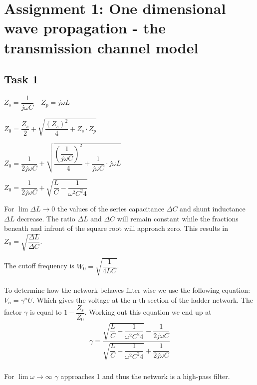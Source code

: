 \documentclass[final]{scrreprt} %
\begin{document}
\chapter{Assignment 1: One dimensional wave propagation - the transmission channel model}
\label{ch:sk5-ass1-task1}
\section*{Task 1}
\begin{center}
$Z_s = \dfrac{1}{j \omega C}$\,\,\,\, $Z_p = j \omega L$

$Z_0 = \dfrac{Z_s}{2} + \sqrt{\dfrac{(Z_s)^2}{4} + Z_s \cdot Z_p}$

$Z_0 = \dfrac{1}{2j \omega C} + \sqrt{\dfrac{(\dfrac{1}{j \omega C})^2}{4} + \dfrac{1}{j \omega C} \cdot j \omega L}$

$Z_0 = \dfrac{1}{2j \omega C} + \sqrt{\dfrac{L}{C} - \dfrac{1}{\omega^2 C^2 4}}$
\end{center}
For $\lim{\Delta  L\to 0}$ the values of the series capacitance $\Delta C$ and shunt inductance $\Delta L$ decrease. The ratio $\Delta L$ and $\Delta C$ will remain constant while the fractions beneath and infront of the square root will approach zero. This results in $Z_0 = \sqrt{\dfrac{\Delta L}{\Delta C}}$.

The cutoff frequency is $W_0 = \sqrt{\dfrac{1}{4LC}}$.\\
\\
To determine how the network behaves filter-wise we use the following equation: $V_n = \gamma^n U$. Which gives the voltage at the n-th section of the ladder network. The factor $\gamma$ is equal to $1 - \dfrac{Z_s}{Z_0}$.
Working out this equation we end up at 
\begin{align*}
\gamma = \dfrac{\sqrt{\dfrac{L}{C} - \dfrac{1}{\omega^2 C^2 4}} - \dfrac{1}{2j \omega C}}{\sqrt{\dfrac{L}{C} - \dfrac{1}{\omega^2 C^2 4}} + \dfrac{1}{2j \omega C}}
\end{align*}
\\For $\lim{\omega \to \infty}$ $\gamma$ approaches 1 and thus the network is a high-pass filter.

\label{ch:sk5-ass1-task2}
\end{document}
